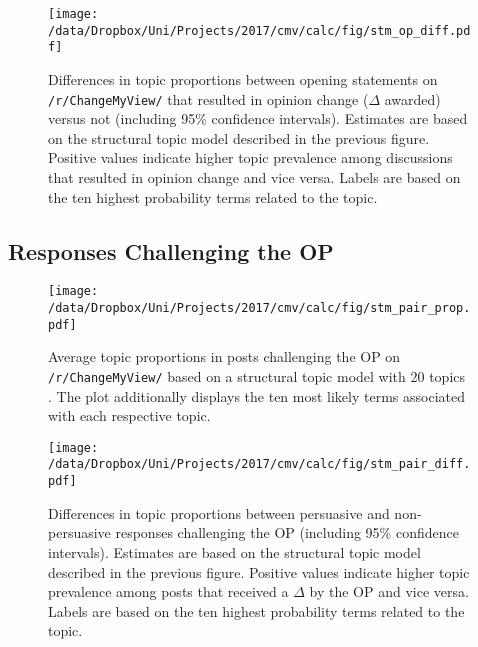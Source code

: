\begin{figure}[h]
\centering
\texttt{[image: /data/Dropbox/Uni/Projects/2017/cmv/calc/fig/stm\_op\_diff.pdf]}
\caption[Differences in topic proportions between opening statements on CMV that resulted in opinion change versus not]{Differences in topic proportions between opening statements on \texttt{/r/ChangeMyView/} that resulted in opinion change ($\Delta$ awarded) versus not (including 95\% confidence intervals). Estimates are based on the structural topic model described in the previous figure. Positive values indicate higher topic prevalence among discussions that resulted in opinion change and vice versa. Labels are based on the ten highest probability terms related to the topic.}
\end{figure}

\clearpage
\subsection{Responses Challenging the OP}

\begin{figure}[h]
\centering
\texttt{[image: /data/Dropbox/Uni/Projects/2017/cmv/calc/fig/stm\_pair\_prop.pdf]}
\caption[Average topic proportions in posts challenging the OP on CMV based on structural topic model]{Average topic proportions in posts challenging the OP on \texttt{/r/ChangeMyView/} based on a structural topic model with 20 topics \citep[c.f.,][]{roberts2014structural}. The plot additionally displays the ten most likely terms associated with each respective topic.}
\end{figure}

\begin{figure}[h]
\centering
\texttt{[image: /data/Dropbox/Uni/Projects/2017/cmv/calc/fig/stm\_pair\_diff.pdf]}
\caption[Differences in topic proportions between persuasive and non-persuasive posts challenging the OP on CMV]{Differences in topic proportions between persuasive and non-persuasive responses challenging the OP (including 95\% confidence intervals). Estimates are based on the structural topic model described in the previous figure. Positive values indicate higher topic prevalence among posts that received a $\Delta$ by the OP and vice versa. Labels are based on the ten highest probability terms related to the topic.}
\end{figure}

